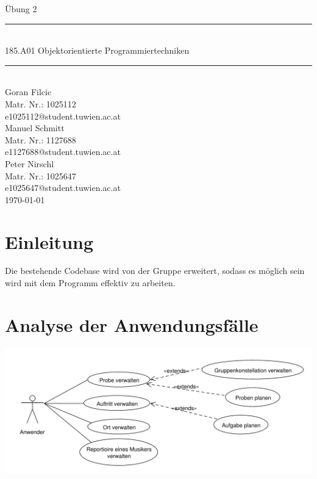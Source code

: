 \documentclass[12pt,oneside,a4paper]{scrartcl}
\begin{document}
\begin{titlepage}

\begin{center}
\vspace*{1cm}
\sffamily \Large Übung 2\\[0.7cm]
\rule{\linewidth}{1pt} \\[0.3cm]
\LARGE 185.A01 Objektorientierte Programmiertechniken \\
\rule{\linewidth}{1pt} \\[1cm]

\normalfont \Large Goran Filcic \\[0.3cm]
\normalsize Matr. Nr.: 1025112 \\[0.1cm]
e1025112@student.tuwien.ac.at \\[0.8cm]

\normalfont \Large Manuel Schmitt\\[0.3cm]
\normalsize Matr. Nr.: 1127688 \\[0.1cm]
e1127688@student.tuwien.ac.at \\[0.8cm]


\normalfont \Large Peter Nirschl \\[0.3cm]
\normalsize Matr. Nr.: 1025647 \\[0.1cm]
e1025647@student.tuwien.ac.at \\[0.8cm]



\Large \today \normalfont
\end{center}
\end{titlepage}

\setcounter{page}{1}
\tableofcontents

\newpage

\section{Einleitung}
Die bestehende Codebase wird von der Gruppe erweitert, sodass es möglich sein wird mit dem Programm effektiv zu arbeiten.

\section{Analyse der Anwendungsfälle}
\begin{center}
	\includegraphics[width=1\textwidth]{usecase.pdf}
\end{center}
\end{document}
